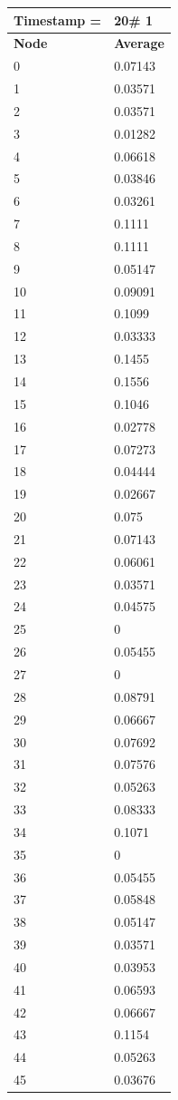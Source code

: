 \begin{tabular}{|l||l|}
\hline
\textbf{Timestamp =} & \textbf{20}\# 1\\\hline
	\textbf{Node} & \textbf{Average} \\ \hline
\hline
	0 & 0.07143 \\ \hline
	1 & 0.03571 \\ \hline
	2 & 0.03571 \\ \hline
	3 & 0.01282 \\ \hline
	4 & 0.06618 \\ \hline
	5 & 0.03846 \\ \hline
	6 & 0.03261 \\ \hline
	7 & 0.1111 \\ \hline
	8 & 0.1111 \\ \hline
	9 & 0.05147 \\ \hline
	10 & 0.09091 \\ \hline
	11 & 0.1099 \\ \hline
	12 & 0.03333 \\ \hline
	13 & 0.1455 \\ \hline
	14 & 0.1556 \\ \hline
	15 & 0.1046 \\ \hline
	16 & 0.02778 \\ \hline
	17 & 0.07273 \\ \hline
	18 & 0.04444 \\ \hline
	19 & 0.02667 \\ \hline
	20 & 0.075 \\ \hline
	21 & 0.07143 \\ \hline
	22 & 0.06061 \\ \hline
	23 & 0.03571 \\ \hline
	24 & 0.04575 \\ \hline
	25 & 0 \\ \hline
	26 & 0.05455 \\ \hline
	27 & 0 \\ \hline
	28 & 0.08791 \\ \hline
	29 & 0.06667 \\ \hline
	30 & 0.07692 \\ \hline
	31 & 0.07576 \\ \hline
	32 & 0.05263 \\ \hline
	33 & 0.08333 \\ \hline
	34 & 0.1071 \\ \hline
	35 & 0 \\ \hline
	36 & 0.05455 \\ \hline
	37 & 0.05848 \\ \hline
	38 & 0.05147 \\ \hline
	39 & 0.03571 \\ \hline
	40 & 0.03953 \\ \hline
	41 & 0.06593 \\ \hline
	42 & 0.06667 \\ \hline
	43 & 0.1154 \\ \hline
	44 & 0.05263 \\ \hline
	45 & 0.03676 \\ \hline
\end{tabular}
